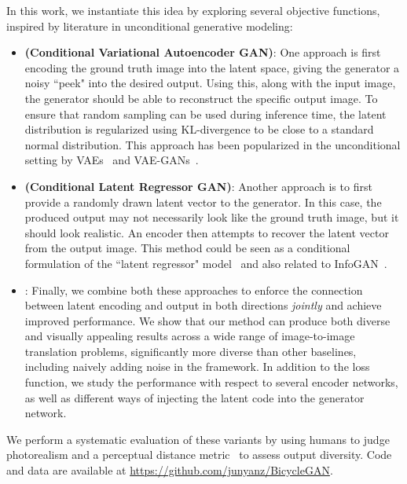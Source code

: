 In this work, we instantiate this idea by exploring several objective functions, inspired by literature in unconditional generative modeling:
  \begin{itemize}[leftmargin=0.1in]
  
    \item \textbf{\cvaegan (Conditional Variational Autoencoder GAN)}:
    One approach is first encoding the ground truth image into the latent space, giving the generator a noisy ``peek" into the desired output. Using this, along with the input image, the generator should be able to reconstruct the specific output image. To ensure that random sampling can be used during inference time, the latent distribution is regularized using KL-divergence to be close to a standard normal distribution. This approach has been popularized in the unconditional setting by VAEs~\citep{kingma2013auto} and VAE-GANs~\citep{larsen2016vaegan}.
    
    \item \textbf{\cinfogan (Conditional Latent Regressor GAN)}: Another approach is to first provide a randomly drawn latent vector to the generator. In this case, the produced output may not necessarily look like the ground truth image, but it should look realistic. An encoder then attempts to recover the latent vector from the output image. This method could be seen as a conditional formulation of the ``latent regressor" model~\citep{donahue2016adversarial,dumoulin2016adversarially} and also related to InfoGAN~\citep{xi2016infogan}.
    
    \item \textbf{\bicycle}: Finally, we combine both these approaches to enforce the connection between latent encoding and output in both directions {\em jointly} and achieve improved performance. We show that our method can produce both diverse and visually appealing results across a wide range of image-to-image translation problems, significantly more diverse than other baselines, including naively adding noise in the \pp framework. In addition to the loss function, we study the performance with respect to several encoder networks, as well as different ways of injecting the latent code into the generator network. 
\end{itemize}

We perform a systematic evaluation of these variants by using humans to judge photorealism and a perceptual distance metric~\cite{zhang2018unreasonable} to assess output diversity. Code and data are available at \url{https://github.com/junyanz/BicycleGAN}.